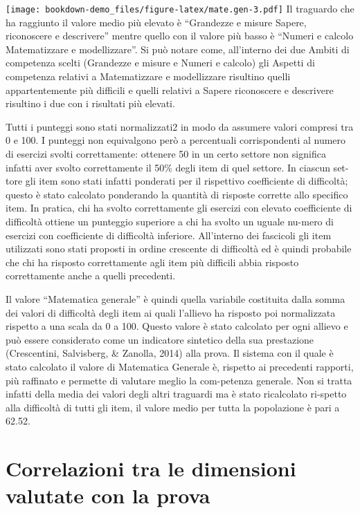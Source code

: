 \documentclass[
]{book}
\begin{document}
\texttt{[image: bookdown-demo\_files/figure-latex/mate.gen-3.pdf]}
Il traguardo che ha raggiunto il valore medio più elevato è ``Grandezze e misure Sapere, riconoscere e descrivere'' mentre quello con il valore più basso è ``Numeri e calcolo Matematizzare e modellizzare''. Si può notare come, all'interno dei due Ambiti di competenza scelti (Grandezze e misure e Numeri e calcolo) gli Aspetti di competenza relativi a Matematizzare e modellizzare risultino quelli appartentemente più difficili e quelli relativi a Sapere riconoscere e descrivere risultino i due con i risultati più elevati.

Tutti i punteggi sono stati normalizzati2 in modo da assumere valori compresi tra 0 e 100. I punteggi non equivalgono però a percentuali corrispondenti al numero di esercizi svolti correttamente: ottenere 50 in un certo settore non significa infatti aver svolto correttamente il 50\% degli item di quel settore. In ciascun set-tore gli item sono stati infatti ponderati per il rispettivo coefficiente di difficoltà; questo è stato calcolato ponderando la quantità di risposte corrette allo specifico item. In pratica, chi ha svolto correttamente gli esercizi con elevato coefficiente di difficoltà ottiene un punteggio superiore a chi ha svolto un uguale nu-mero di esercizi con coefficiente di difficoltà inferiore. All'interno dei fascicoli gli item utilizzati sono stati proposti in ordine crescente di difficoltà ed è quindi probabile che chi ha risposto correttamente agli item più difficili abbia risposto correttamente anche a quelli precedenti.

Il valore ``Matematica generale'' è quindi quella variabile costituita dalla somma dei valori di difficoltà degli item ai quali l'allievo ha risposto poi normalizzata rispetto a una scala da 0 a 100. Questo valore è stato calcolato per ogni allievo e può essere considerato come un indicatore sintetico della sua prestazione (Crescentini, Salvisberg, \& Zanolla, 2014) alla prova. Il sistema con il quale è stato calcolato il valore di Matematica Generale è, rispetto ai precedenti rapporti, più raffinato e permette di valutare meglio la com-petenza generale. Non si tratta infatti della media dei valori degli altri traguardi ma è stato ricalcolato ri-spetto alla difficoltà di tutti gli item, il valore medio per tutta la popolazione è pari a 62.52.

\hypertarget{correlazioni-tra-le-dimensioni-valutate-con-la-prova}{%
\section{Correlazioni tra le dimensioni valutate con la prova}\label{correlazioni-tra-le-dimensioni-valutate-con-la-prova}}
\end{document}
